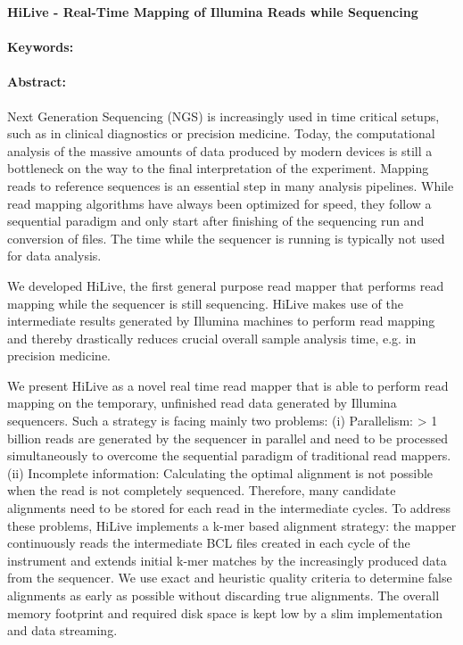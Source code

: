 \noindent
\large {\bf HiLive - Real-Time Mapping of Illumina Reads while Sequencing } 


\normalsize 


\noindent \paragraph{Keywords:} 

\noindent \paragraph{Abstract:} 

Next Generation Sequencing (NGS) is increasingly used in time critical setups, such as in clinical
diagnostics or precision medicine. Today, the computational analysis of the massive amounts of data
produced by modern devices is still a bottleneck on the way to the final interpretation of the
experiment. Mapping reads to reference sequences is an essential step in many analysis pipelines.
While read mapping algorithms have always been optimized for speed, they follow a sequential
paradigm and only start after finishing of the sequencing run and conversion of files. The time while
the sequencer is running is typically not used for data analysis.

We developed HiLive, the first general purpose read mapper that performs read mapping while the
sequencer is still sequencing. HiLive makes use of the intermediate results generated by Illumina
machines to perform read mapping and thereby drastically reduces crucial overall sample analysis
time, e.g. in precision medicine.

We present HiLive as a novel real time read mapper that is able to perform read mapping on the
temporary, unfinished read data generated by Illumina sequencers. Such a strategy is facing mainly
two problems: (i) Parallelism: > 1 billion reads are generated by the sequencer in parallel and need to
be processed simultaneously to overcome the sequential paradigm of traditional read mappers. (ii)
Incomplete information: Calculating the optimal alignment is not possible when the read is not
completely sequenced. Therefore, many candidate alignments need to be stored for each read in the
intermediate cycles. To address these problems, HiLive implements a k-mer based alignment
strategy: the mapper continuously reads the intermediate BCL files created in each cycle of the
instrument and extends initial k-mer matches by the increasingly produced data from the sequencer.
We use exact and heuristic quality criteria to determine false alignments as early as possible without
discarding true alignments. The overall memory footprint and required disk space is kept low by a
slim implementation and data streaming.

